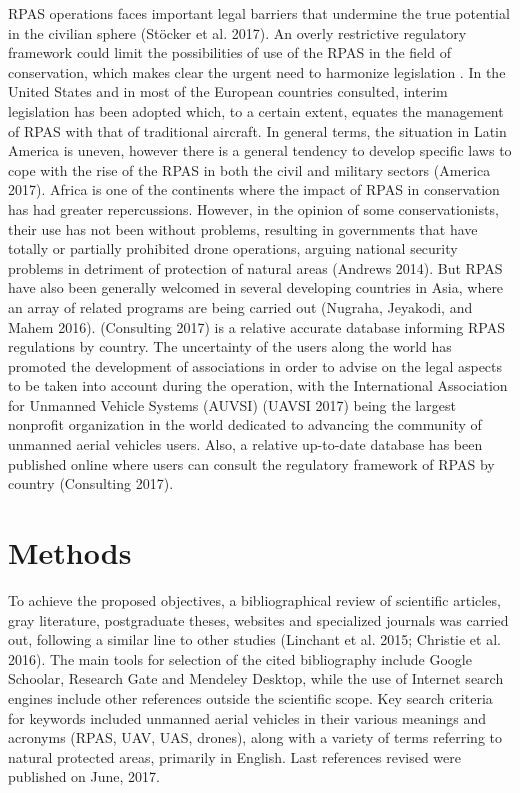 \documentclass[]{interact}
\theoremstyle{plain}%
\theoremstyle{definition}
\theoremstyle{remark}
\begin{document}
RPAS operations faces important legal barriers that undermine the true
potential in the civilian sphere (Stöcker et al. 2017). An overly
restrictive regulatory framework could limit the possibilities of use of
the RPAS in the field of conservation, which makes clear the urgent need
to harmonize legislation . In the United States and in most of the
European countries consulted, interim legislation has been adopted
which, to a certain extent, equates the management of RPAS with that of
traditional aircraft. In general terms, the situation in Latin America
is uneven, however there is a general tendency to develop specific laws
to cope with the rise of the RPAS in both the civil and military sectors
(America 2017). Africa is one of the continents where the impact of RPAS
in conservation has had greater repercussions. However, in the opinion
of some conservationists, their use has not been without problems,
resulting in governments that have totally or partially prohibited drone
operations, arguing national security problems in detriment of
protection of natural areas (Andrews 2014). But RPAS have also been
generally welcomed in several developing countries in Asia, where an
array of related programs are being carried out (Nugraha, Jeyakodi, and
Mahem 2016). (Consulting 2017) is a relative accurate database informing
RPAS regulations by country. The uncertainty of the users along the
world has promoted the development of associations in order to advise on
the legal aspects to be taken into account during the operation, with
the International Association for Unmanned Vehicle Systems (AUVSI)
(UAVSI 2017) being the largest nonprofit organization in the world
dedicated to advancing the community of unmanned aerial vehicles users.
Also, a relative up-to-date database has been published online where
users can consult the regulatory framework of RPAS by country
(Consulting 2017).

\section{Methods}\label{methods}

To achieve the proposed objectives, a bibliographical review of
scientific articles, gray literature, postgraduate theses, websites and
specialized journals was carried out, following a similar line to other
studies (Linchant et al. 2015; Christie et al. 2016). The main tools for
selection of the cited bibliography include Google Schoolar, Research
Gate and Mendeley Desktop, while the use of Internet search engines
include other references outside the scientific scope. Key search
criteria for keywords included unmanned aerial vehicles in their various
meanings and acronyms (RPAS, UAV, UAS, drones), along with a variety of
terms referring to natural protected areas, primarily in English. Last
references revised were published on June, 2017.
\end{document}
